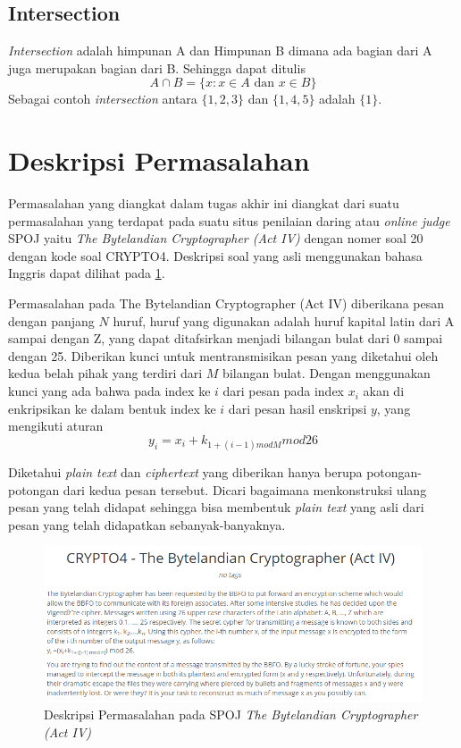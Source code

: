 	\subsection{Intersection}
	\textit{Intersection} adalah himpunan A dan Himpunan B dimana ada bagian dari A juga merupakan bagian dari B. Sehingga dapat ditulis 
	$$A\cap{B=\{x:x\in A \textrm{ dan } x \in B \}}$$
	Sebagai contoh \textit{intersection} antara $\{1,2,3\}$ dan $\{1,4,5\}$ adalah $\{1\}$.\cite{devlin_joy_1993}	
	
	\section{Deskripsi Permasalahan}
	\label{chapter:dasar-teori}
	Permasalahan yang diangkat dalam tugas akhir ini diangkat dari suatu permasalahan yang terdapat pada suatu situs penilaian daring atau \textit{online judge} SPOJ yaitu \textit{The Bytelandian Cryptographer (Act IV)} dengan nomer soal 20 dengan kode soal CRYPTO4. Deskripsi soal yang asli menggunakan bahasa Inggris dapat dilihat pada \ref{fig:crypto4_def}.\cite{piwakowski_crypto4_2004}
	
	
	 Permasalahan pada The Bytelandian Cryptographer (Act IV) diberikana pesan dengan panjang $N$ huruf, huruf yang digunakan adalah huruf kapital latin dari A sampai dengan Z, yang dapat ditafsirkan menjadi bilangan bulat dari 0 sampai dengan 25. Diberikan kunci untuk mentransmisikan pesan yang diketahui oleh kedua belah pihak yang terdiri dari $M$ bilangan bulat. Dengan menggunakan kunci yang ada bahwa pada index ke $i$ dari pesan pada index $x_i$ akan di enkripsikan ke dalam bentuk index ke $i$ dari pesan hasil enskripsi $y$, yang mengikuti aturan
	 $$y_i=x_i+k_{1+(i-1)mod M} mod 26 $$
	 
	 
	 Diketahui \textit{plain text} dan \textit{ciphertext} yang diberikan hanya berupa potongan-potongan dari kedua pesan tersebut. Dicari bagaimana menkonstruksi ulang pesan yang telah didapat sehingga bisa membentuk \textit{plain text} yang asli dari pesan yang telah didapatkan sebanyak-banyaknya.
	\begin{figure}[H]
		\centering
		\includegraphics[scale=0.5]{images/bab2/crypto_def.png}
		\caption{Deskripsi Permasalahan pada SPOJ \textit{The Bytelandian Cryptographer (Act IV)}}
		\label{fig:crypto4_def}
	\end{figure}
	
